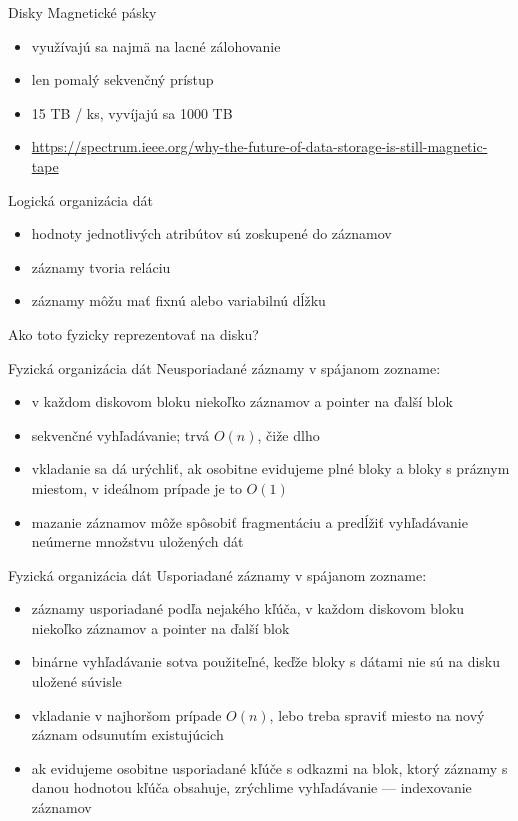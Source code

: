 \documentclass[12pt]{beamer}
\begin{document}
\begin{frame}[fragile]{Disky}
Magnetické pásky
\begin{itemize}
\item využívajú sa najmä na lacné zálohovanie
\item len pomalý sekvenčný prístup
\item 15 TB / ks, vyvíjajú sa 1000 TB
\item {\scriptsize\url{https://spectrum.ieee.org/why-the-future-of-data-storage-is-still-magnetic-tape}}
\end{itemize}
\end{frame}

\begin{frame}[fragile]{Logická organizácia dát}
\begin{itemize}
\item hodnoty jednotlivých atribútov sú zoskupené do záznamov
\item záznamy tvoria reláciu
\item záznamy môžu mať fixnú alebo variabilnú dĺžku
\end{itemize}
Ako toto fyzicky reprezentovať na disku?
\end{frame}

\begin{frame}[fragile]{Fyzická organizácia dát}
Neusporiadané záznamy v spájanom zozname:
\begin{itemize}
\item v každom diskovom bloku niekoľko záznamov a pointer na ďalší blok
\item sekvenčné vyhľadávanie; trvá $O(n)$, čiže dlho
\item vkladanie sa dá urýchliť, ak osobitne evidujeme plné bloky a bloky s práznym miestom, v ideálnom prípade je to $O(1)$
\item mazanie záznamov môže spôsobiť fragmentáciu a predĺžiť vyhľadávanie neúmerne množstvu uložených dát
\end{itemize}
\end{frame}

\begin{frame}[fragile]{Fyzická organizácia dát}
Usporiadané záznamy v spájanom zozname:
\begin{itemize}
\item záznamy usporiadané podľa nejakého kľúča, v každom diskovom bloku niekoľko záznamov a pointer na ďalší blok
\item binárne vyhľadávanie sotva použiteľné, keďže bloky s dátami nie sú na disku uložené súvisle
\item vkladanie v najhoršom prípade $O(n)$, lebo treba spraviť miesto na nový záznam odsunutím existujúcich
\item ak evidujeme osobitne usporiadané kľúče s odkazmi na blok, ktorý záznamy s danou hodnotou kľúča obsahuje, zrýchlime vyhľadávanie --- indexovanie záznamov 
\end{itemize}
\end{frame}
\end{document}
